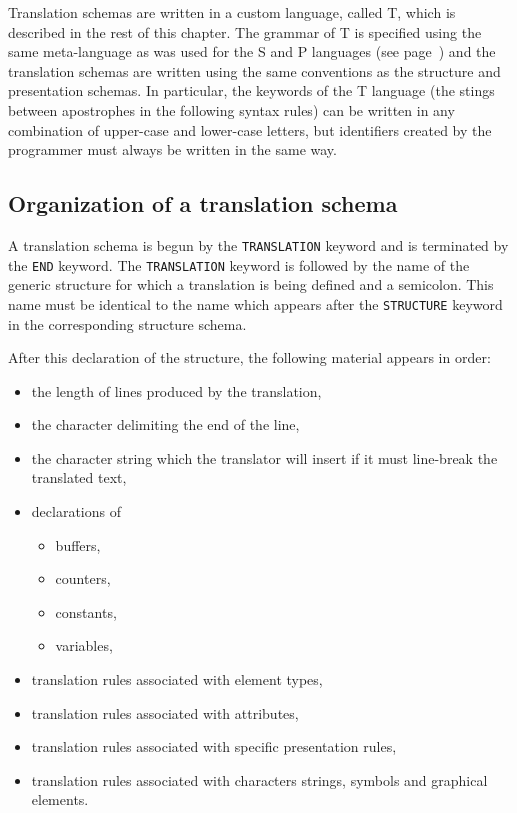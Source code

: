 Translation schemas are written in a custom language, called T, which
is described in the rest of this chapter.  The grammar of T is
specified using the same meta-language as was used for the S and P
languages (see page~\pageref{metalang}) and the translation schemas
are written using the same conventions as the structure and
presentation schemas.  In particular, the keywords of the T language
(the stings between apostrophes in the following syntax rules) can be
written in any combination of upper-case and lower-case letters, but
identifiers created by the programmer must always be written in the
same way.

\subsection{Organization of a translation schema}

A translation schema is begun by the {\tt TRANSLATION} keyword and
is terminated by the {\tt END} keyword.  The {\tt TRANSLATION} keyword
is followed by the name of the generic structure for which a
translation is being defined and a semicolon.  This name must be
identical to the name which appears after the {\tt STRUCTURE} keyword
in the corresponding structure schema.

After this declaration of the structure, the following material
appears in order:
\begin{itemize}
\item the length of lines produced by the translation,

\item the character delimiting the end of the line,

\item the character string which the translator will insert if it must
line-break the translated text,

\item declarations of
\begin{itemize}
  \item buffers,
  \item counters,
  \item constants,
  \item variables,
\end{itemize}

\item translation rules associated with element types,

\item translation rules associated with attributes,

\item translation rules associated with specific presentation rules,

\item translation rules associated with characters strings, symbols and graphical
elements.
\end{itemize}

